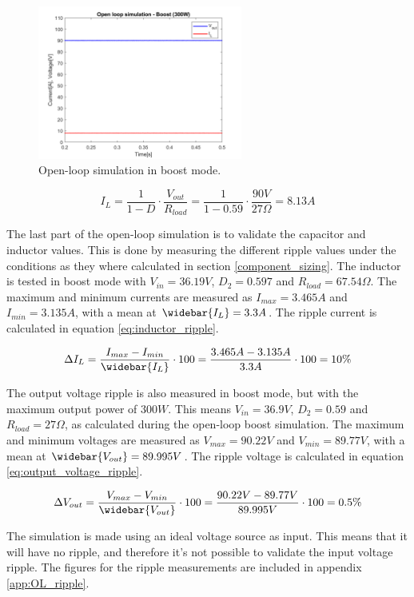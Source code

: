 \begin{figure}[H]
	\begin{center}
		\includegraphics[width=0.6\textwidth]{../Pictures/P1/Open_loop_simulation/open_loop_boost_300W}
		\caption{Open-loop simulation in boost mode.}
		\label{fig:OL_boostsimulation}
	\end{center}
\end{figure}



\begin{equation} \label{eq:IL_boost}
	I_L = \frac{1}{1-D} \cdot \frac{V_{out}}{R_{load}} = \frac{1}{1-0.59} \cdot \frac{90V}{27\Omega} = 8.13A
\end{equation}

The last part of the open-loop simulation is to validate the capacitor and inductor values. This is done by measuring the different ripple values under the conditions as they where calculated in section \ref{component_sizing}. The inductor is tested in boost mode with $V_{in} = 36.19V$, $D_{2} = 0.597$ and $R_{load} = 67.54\Omega$. The maximum and minimum currents are measured as $I_{max} = 3.465A$ and $I_{min} = 3.135A$, with a mean at $\widebar{I_L} = 3.3A$. The ripple current is calculated in equation \ref{eq:inductor_ripple}.

\begin{equation} \label{eq:inductor_ripple}
	\Delta I_L = \frac{I_{max}-I_{min}}{\widebar{I_L}} \cdot 100 = \frac{3.465A-3.135A}{3.3A} \cdot 100 = 10\%
\end{equation}

The output voltage ripple is also measured in boost mode, but with the maximum output power of $300W$. This means $V_{in} = 36.9V$, $D_{2} = 0.59$ and $R_{load} = 27\Omega$, as calculated during the open-loop boost simulation. The maximum and minimum voltages are measured as $V_{max} = 90.22V$ and $V_{min} = 89.77V$, with a mean at $\widebar{V_{out}} = 89.995V$. The ripple voltage is calculated in equation \ref{eq:output_voltage_ripple}.

\begin{equation} \label{eq:output_voltage_ripple}
\Delta V_{out} = \frac{V_{max}-V_{min}}{\widebar{V_{out}}} \cdot 100 = \frac{90.22V-89.77V}{89.995V} \cdot 100 = 0.5\%
\end{equation}

The simulation is made using an ideal voltage source as input. This means that it will have no ripple, and therefore it's not possible to validate the input voltage ripple. The figures for the ripple measurements are included in appendix \ref{app:OL_ripple}.


